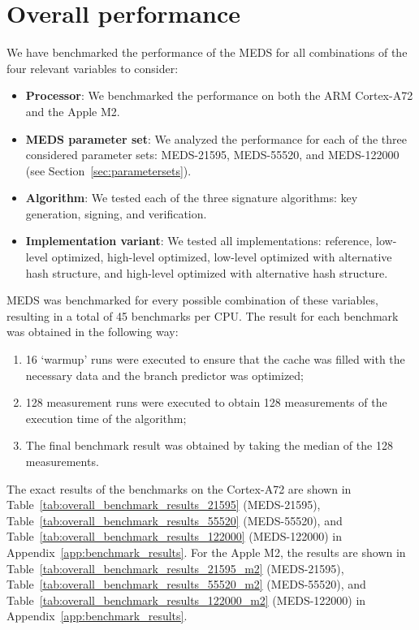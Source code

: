 \documentclass[11pt,a4paper]{report}
\theoremstyle{definition}
\begin{document}
\section{Overall performance}
\label{sec:overallperformance}
We have benchmarked the performance of the MEDS for all combinations of the four relevant variables to consider:
\begin{itemize}
  \item \textbf{Processor}: We benchmarked the performance on both the ARM Cortex-A72 and the Apple M2.
  \item \textbf{MEDS parameter set}: We analyzed the performance for each of the three considered parameter sets: MEDS-21595, MEDS-55520, and MEDS-122000 (see Section~\ref{sec:parametersets}).
  \item \textbf{Algorithm}: We tested each of the three signature algorithms: key generation, signing, and verification.
  \item \textbf{Implementation variant}: We tested all implementations: reference, low-level optimized, high-level optimized, low-level optimized with alternative hash structure, and high-level optimized with alternative hash structure.
\end{itemize}
MEDS was benchmarked for every possible combination of these variables, resulting in a total of 45 benchmarks per CPU. The result for each benchmark was obtained in the following way:
\begin{enumerate}
  \item 16 `warmup' runs were executed to ensure that the cache was filled with the necessary data and the branch predictor was optimized;
  \item 128 measurement runs were executed to obtain 128 measurements of the execution time of the algorithm;
  \item The final benchmark result was obtained by taking the median of the 128 measurements.
\end{enumerate}

The exact results of the benchmarks on the Cortex-A72 are shown in Table~\ref{tab:overall_benchmark_results_21595} (MEDS-21595), Table~\ref{tab:overall_benchmark_results_55520} (MEDS-55520), and Table~\ref{tab:overall_benchmark_results_122000} (MEDS-122000) in Appendix~\ref{app:benchmark_results}. For the Apple M2, the results are shown in Table~\ref{tab:overall_benchmark_results_21595_m2} (MEDS-21595), Table~\ref{tab:overall_benchmark_results_55520_m2} (MEDS-55520), and Table~\ref{tab:overall_benchmark_results_122000_m2} (MEDS-122000) in Appendix~\ref{app:benchmark_results}.
\end{document}
